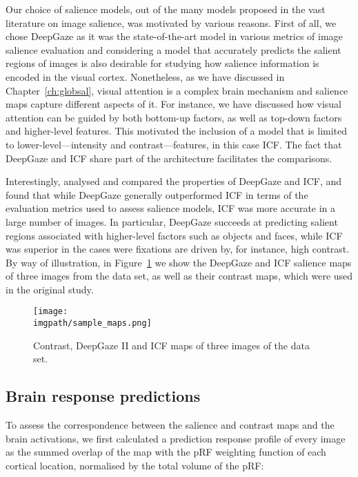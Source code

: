{Our choice of salience models, out of the many models proposed in the vast literature on image salience, was motivated by various reasons. First of all, we chose DeepGaze as it was the state-of-the-art model in various metrics of image salience evaluation \citep{kuemmerer2016deepgaze} and considering a model that accurately predicts the salient regions of images is also desirable for studying how salience information is encoded in the visual cortex. Nonetheless, as we have discussed in Chapter~\ref{ch:globsal}, visual attention is a complex brain mechanism and salience maps capture different aspects of it. For instance, we have discussed how visual attention can be guided by both bottom-up factors, as well as top-down factors and higher-level features. This motivated the inclusion of a model that is limited to lower-level---intensity and contrast---features, in this case ICF. The fact that DeepGaze and ICF share part of the architecture facilitates the comparisons. 

Interestingly, \citet{kuemmerer2017icfdeepgaze} analysed and compared the properties of DeepGaze and ICF, and found that while DeepGaze generally outperformed ICF in terms of the evaluation metrics used to assess salience models, ICF was more accurate in a large number of images. In particular, DeepGaze succeeds at predicting salient regions associated with higher-level factors such as objects and faces, while ICF was superior in the cases were fixations are driven by, for instance, high contrast. By way of illustration, in Figure~\ref{fig:imageid-sample_maps} we show the DeepGaze and ICF salience maps of three images from the data set, as well as their contrast maps, which were used in the original study.

\begin{figure}[htb]
  \begin{center}
    \texttt{[image: \\imgpath/sample\_maps.png]}
  \end{center}
  \caption{Contrast, DeepGaze II and ICF maps of three images of the data set.}
\label{fig:imageid-sample_maps}
\end{figure}

\subsection{Brain response predictions}
To assess the correspondence between the salience and contrast maps and the brain activations, we first calculated a prediction response profile of every image as the summed overlap of the map with the pRF weighting function of each cortical location, normalised by the total volume of the pRF: 

}
